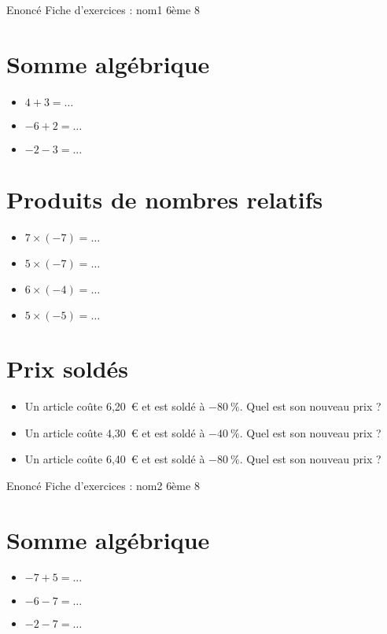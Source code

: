 \documentclass[a4paper,11pt,fleqn]{article}
\begin{document}
\pagestyle{empty}


{Enoncé} \hfill {\huge Fiche d'exercices  : nom1} \hfill {6ème 8}

\section{Somme algébrique}
\begin{itemize}

  \item $4 +3=\ldots$
  \item $-6 +2=\ldots$
  \item $-2 -3=\ldots$
\end{itemize}


\section{Produits de nombres relatifs}
\begin{itemize}

  \item $7\times(-7)=\ldots$
  \item $5\times(-7)=\ldots$
  \item $6\times(-4)=\ldots$
  \item $5\times(-5)=\ldots$
\end{itemize}


\section{Prix soldés}
\begin{itemize}

  \item Un article coûte 6,20~€ et est soldé à $-80~\%$. Quel est son nouveau prix ?
  \item Un article coûte 4,30~€ et est soldé à $-40~\%$. Quel est son nouveau prix ?
  \item Un article coûte 6,40~€ et est soldé à $-80~\%$. Quel est son nouveau prix ?
\end{itemize}
\newpage
\setcounter{exo}{0}
\setcounter{section}{0}
{Enoncé} \hfill {\huge Fiche d'exercices  : nom2} \hfill {6ème 8}

\section{Somme algébrique}
\begin{itemize}

  \item $-7 +5=\ldots$
  \item $-6 -7=\ldots$
  \item $-2 -7=\ldots$
\end{itemize}
\end{document}

